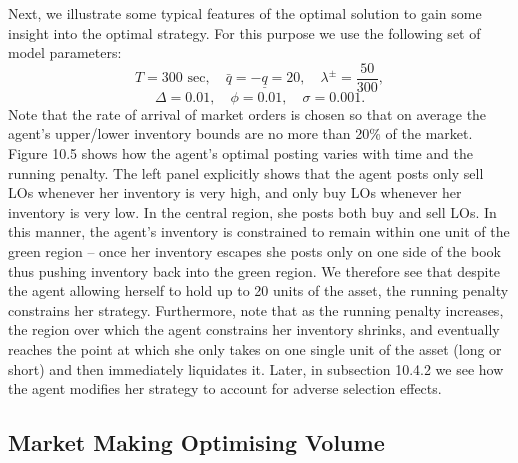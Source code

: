 \documentclass[11pt, a4paper]{book}
\begin{document}
	Next, we illustrate some typical features of the optimal solution to gain some insight into the optimal strategy. For this purpose we use the following set of model parameters:
	\[
	T = 300 \text{ sec}, \quad \bar{q} = -\underline{q} = 20, \quad \lambda^\pm = \frac{50}{300},
	\]
	\[
	\Delta = 0.01, \quad \phi = 0.01, \quad \sigma = 0.001.
	\]
	Note that the rate of arrival of market orders is chosen so that on average the agent's upper/lower inventory bounds are no more than 20\% of the market.
	Figure 10.5 shows how the agent's optimal posting varies with time and the running penalty. The left panel explicitly shows that the agent posts only sell LOs whenever her inventory is very high, and only buy LOs whenever her inventory is very low. In the central region, she posts both buy and sell LOs. In this manner, the agent's inventory is constrained to remain within one unit of the green region – once her inventory escapes she posts only on one side of the book thus pushing inventory back into the green region. We therefore see that despite the agent allowing herself to hold up to 20 units of the asset, the running penalty constrains her strategy. Furthermore, note that as the running penalty increases, the region over which the agent constrains her inventory shrinks, and eventually reaches the point at which she only takes on one single unit of the asset (long or short) and then immediately liquidates it.
	Later, in subsection 10.4.2 we see how the agent modifies her strategy to account for adverse selection effects.
	
	\subsection{Market Making Optimising Volume} \label{sec:10.2.3}
	
\end{document}
